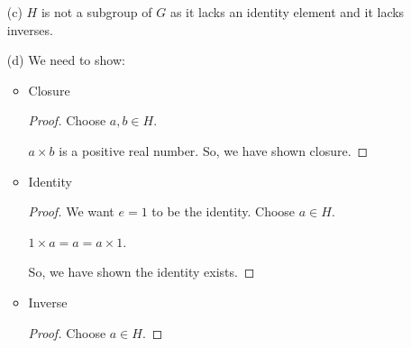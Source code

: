 \documentclass[12pt,letterpaper]{article}
\begin{document}
\begin{enumerate}
\begin{enumerate}
\begin{itemize}
\begin{proof}
                So every element is in $H$, thus we have closure.
              \end{proof}
            \item Identity
              \begin{proof}
                Again, we can prove by enumeration that $e = 1$.
                \[1 \times 1 = 1 = 1 \times 1\]
                \[-1 \times 1 = -1 = 1 \times -1\]

                Thus, the identity exists.
              \end{proof}
            \item Inverse
              \begin{proof}
                Once again, we prove by enumeration.
                \[1 \times 1 = 1 = 1 \times 1\]
                \[-1 \times -1 = 1 = -1 \times -1\]

                Thus, each element in $H$ has an inverse.
              \end{proof}
          \end{itemize}

          From these three we have shown that $H$ is a subgroup of $G$.

        \item[(c)]
          $H$ is not a subgroup of $G$ as it lacks an identity element and it lacks inverses.
        \item[(d)]
          We need to show:
          \begin{itemize}
            \item Closure
              \begin{proof}
                Choose $a, b \in H$.

                $a \times b$ is a positive real number.
                So, we have shown closure.
              \end{proof}
            \item Identity
              \begin{proof}
                We want $e = 1$ to be the identity.
                Choose $a \in H$.

                $1 \times a = a = a \times 1$.

                So, we have shown the identity exists.
              \end{proof}
            \item Inverse
              \begin{proof}
                Choose $a \in H$.


\end{proof}
\end{itemize}
\end{enumerate}
\end{enumerate}
\end{document}
